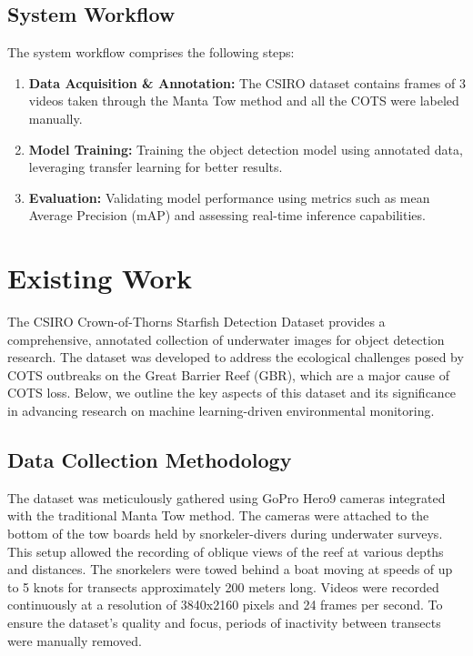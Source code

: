 \documentclass[conference]{IEEEtran}
\begin{document}
\subsection{System Workflow}
The system workflow comprises the following steps:
\begin{enumerate}
    \item \textbf{Data Acquisition \& Annotation:} The CSIRO dataset\cite{liu2021csiro} contains frames of 3 videos taken through the Manta Tow method and all the COTS were labeled manually.
    \item \textbf{Model Training:} Training the object detection model using annotated data, leveraging transfer learning for better results.
    \item \textbf{Evaluation:} Validating model performance using metrics such as mean Average Precision (mAP) and assessing real-time inference capabilities.
\end{enumerate}

\section{Existing Work}
The CSIRO Crown-of-Thorns Starfish Detection Dataset provides a comprehensive, annotated collection of underwater images for object detection research. The dataset was developed to address the ecological challenges posed by COTS outbreaks on the Great Barrier Reef (GBR), which are a major cause of COTS loss. Below, we outline the key aspects of this dataset and its significance in advancing research on machine learning-driven environmental monitoring.

\subsection{Data Collection Methodology}
The dataset was meticulously gathered using GoPro Hero9 cameras integrated with the traditional Manta Tow method. The cameras were attached to the bottom of the tow boards held by snorkeler-divers during underwater surveys. This setup allowed the recording of oblique views of the reef at various depths and distances. The snorkelers were towed behind a boat moving at speeds of up to 5 knots for transects approximately 200 meters long. Videos were recorded continuously at a resolution of 3840x2160 pixels and 24 frames per second. To ensure the dataset's quality and focus, periods of inactivity between transects were manually removed.
\end{document}

